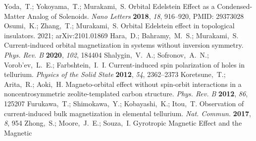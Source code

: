 \documentclass[journal=nalefd,manuscript=article,layout=twocolumn]{achemso}
\begin{document}
\begin{mcitethebibliography}{48}
\EndOfBibitem
{}
Yoda,~T.; Yokoyama,~T.; Murakami,~S. Orbital Edelstein Effect as a
  Condensed-Matter Analog of Solenoids. \emph{Nano Letters} \textbf{2018},
  \emph{18}, 916--920, PMID: 29373028\relax
\mciteBstWouldAddEndPuncttrue
\mciteSetBstMidEndSepPunct{\mcitedefaultmidpunct}
{\mcitedefaultendpunct}{\mcitedefaultseppunct}\relax
\EndOfBibitem
{}
Osumi,~K.; Zhang,~T.; Murakami,~S. Orbital Edelstein effect in topological
  insulators. 2021; arXiv:2101.01869\relax
\mciteBstWouldAddEndPuncttrue
\mciteSetBstMidEndSepPunct{\mcitedefaultmidpunct}
{\mcitedefaultendpunct}{\mcitedefaultseppunct}\relax
\EndOfBibitem
{}
Hara,~D.; Bahramy,~M.~S.; Murakami,~S. Current-induced orbital magnetization in
  systems without inversion symmetry. \emph{Phys. Rev. B} \textbf{2020},
  \emph{102}, 184404\relax
\mciteBstWouldAddEndPuncttrue
\mciteSetBstMidEndSepPunct{\mcitedefaultmidpunct}
{\mcitedefaultendpunct}{\mcitedefaultseppunct}\relax
\EndOfBibitem
{}
Shalygin,~V.~A.; Sofronov,~A.~N.; Vorob'ev,~L.~E.; Farbshtein,~I.~I.
  Current-induced spin polarization of holes in tellurium. \emph{Physics of the
  Solid State} \textbf{2012}, \emph{54}, 2362--2373\relax
\mciteBstWouldAddEndPuncttrue
\mciteSetBstMidEndSepPunct{\mcitedefaultmidpunct}
{\mcitedefaultendpunct}{\mcitedefaultseppunct}\relax
\EndOfBibitem
{}
Koretsune,~T.; Arita,~R.; Aoki,~H. Magneto-orbital effect without spin-orbit
  interactions in a noncentrosymmetric zeolite-templated carbon structure.
  \emph{Phys. Rev. B} \textbf{2012}, \emph{86}, 125207\relax
\mciteBstWouldAddEndPuncttrue
\mciteSetBstMidEndSepPunct{\mcitedefaultmidpunct}
{\mcitedefaultendpunct}{\mcitedefaultseppunct}\relax
\EndOfBibitem
{}
Furukawa,~T.; Shimokawa,~Y.; Kobayashi,~K.; Itou,~T. Observation of
  current-induced bulk magnetization in elemental tellurium. \emph{Nat.
  Commun.} \textbf{2017}, \emph{8}, 954\relax
\mciteBstWouldAddEndPuncttrue
\mciteSetBstMidEndSepPunct{\mcitedefaultmidpunct}
{\mcitedefaultendpunct}{\mcitedefaultseppunct}\relax
\EndOfBibitem
{}
Zhong,~S.; Moore,~J.~E.; Souza,~I. Gyrotropic Magnetic Effect and the Magnetic

\end{mcitethebibliography}
\end{document}
